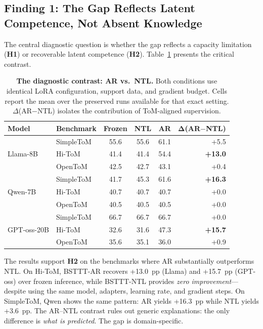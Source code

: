 \subsection{Finding 1: The Gap Reflects Latent Competence, Not Absent Knowledge}
\label{sec:domain_specific}

The central diagnostic question is whether the gap reflects a capacity limitation (\textbf{H1}) or recoverable latent competence (\textbf{H2}).
Table~\ref{tab:ar_vs_ntl} presents the critical contrast.

\begin{table}[t]
    \caption{\textbf{The diagnostic contrast: AR vs.\ NTL.}
    Both conditions use identical LoRA configuration, support data, and gradient budget.
    Cells report the mean over the preserved runs available for that exact setting.
    $\Delta$(AR$-$NTL) isolates the contribution of ToM-aligned supervision.}
    \label{tab:ar_vs_ntl}
    \centering
    \small
    \begin{tabular}{@{}llcccr@{}}
        \toprule
        \textbf{Model} & \textbf{Benchmark} & \textbf{Frozen} & \textbf{NTL} & \textbf{AR} & $\boldsymbol{\Delta}$\textbf{(AR$-$NTL)} \\
        \midrule
        \multirow{3}{*}{Llama-8B}
            & SimpleToM  & 55.6 & 55.6 & 61.1 & +5.5 \\
            & Hi-ToM     & 41.4 & 41.4 & 54.4 & \textbf{+13.0} \\
            & OpenToM    & 42.5 & 42.7 & 43.1 & +0.4 \\
        \midrule
        \multirow{3}{*}{Qwen-7B}
            & SimpleToM  & 41.7 & 45.3 & 61.6 & \textbf{+16.3} \\
            & Hi-ToM     & 40.7 & 40.7 & 40.7 & +0.0 \\
            & OpenToM    & 40.5 & 40.5 & 40.5 & +0.0 \\
        \midrule
        \multirow{3}{*}{GPT-oss-20B}
            & SimpleToM  & 66.7 & 66.7 & 66.7 & +0.0 \\
            & Hi-ToM     & 32.6 & 31.6 & 47.3 & \textbf{+15.7} \\
            & OpenToM    & 35.6 & 35.1 & 36.0 & +0.9 \\
        \bottomrule
    \end{tabular}
\end{table}

The results support \textbf{H2} on the benchmarks where AR substantially outperforms NTL.
On Hi-ToM, BSTTT-AR recovers +13.0~pp (Llama) and +15.7~pp (GPT-oss) over frozen inference, while BSTTT-NTL provides \emph{zero improvement}---despite using the same model, adapters, learning rate, and gradient steps.
On SimpleToM, Qwen shows the same pattern: AR yields +16.3~pp while NTL yields +3.6~pp.
The AR--NTL contrast rules out generic explanations: the only difference is \emph{what is predicted}. The gap is domain-specific.

